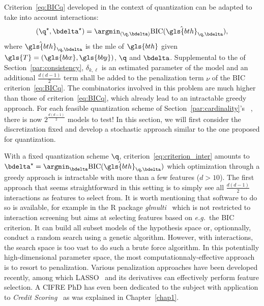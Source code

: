 Criterion~\eqref{eq:BICq} developed in the context of quantization can be adapted to take into account interactions:
\begin{equation} \label{eq:criterion_inter}
(\q^\star,\bdelta^\star) = \argmin_{(\q,\bdelta)} \text{BIC}(\hat{\gls{bth}}_{\q,\bdelta}),
\end{equation}
where $\hat{\gls{bth}}_{\q,\bdelta}$ is the \gls{mle} of $\gls{bth}$ given $\gls{T} = (\gls{bbx},\gls{bby})$, $\q$ and $\bdelta$. Supplemental to the  of Section~\ref{par:consistency}, $\delta_{k,\ell}$ is an estimated parameter of the model and an additional $\frac{d(d-1)}{2}$ term shall be added to the penalization term $\nu$ of the BIC criterion~\eqref{eq:BICq}. The combinatorics involved in this problem are much higher than those of criterion~\eqref{eq:BICq}, which already lead to an intractable greedy approach. For each feasible quantization scheme of Section~\ref{par:cardinality}'s ~, there is now $2^{\frac{d(d-1)}{2}}$ models to test! In this section, we will first consider the discretization fixed and develop a stochastic approach similar to the one proposed for quantization.

With a fixed quantization scheme $\q$, criterion~\ref{eq:criterion_inter} amounts to $\bdelta^\star = \argmin_{\bdelta} \text{BIC}(\hat{\gls{bth}}_{\q,\bdelta})$ which optimization through a greedy approach is intractable with more than a few features ($d > 10$). The first approach that seems straightforward in this setting is to simply see all $\frac{d(d-1)}{2}$ interactions as features to select from. It is worth mentioning that software to do so is available, for example in the \textsf{R} package \textit{glmulti}~\cite{calcagno2010glmulti} which is not restricted to interaction screening but aims at selecting features based on \textit{e.g.}\ the BIC criterion. It can build all subset models of the hypothesis space or, optionnally, conduct a random search using a genetic algorithm. However, with interactions, the search space is too vast to do such a brute force algorithm. In this potentially high-dimensional parameter space, the most computationnaly-effective approach is to resort to penalization. Various penalization approaches have been developed recently, among which LASSO~\cite{tibshirani1996regression} and its derivatives can effectively perform feature selection. A CIFRE PhD has even been dedicated to the subject with application to \textit{Credit Scoring}~\cite{vital2016} as was explained in Chapter~\ref{chap1}.


